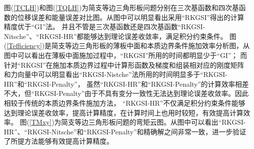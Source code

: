 图(\ref{TCLH})和图(\ref{TQLH})为简支等边三角形板问题分别在三次基函数和四次基函数的位移误差和能量误差对比图。从图中可以明显看出采用“RKGSI”得出的计算精度优于“GI”法。
并且不管是三次基函数还是四次基函数“RKGSI-Nitsche”、“RKGSI-HR”都能够达到理论误差收敛率，满足积分约束条件。
图(\ref{Tefficiency})是简支等边三角形板的薄板中面和本质边界条件施加效率分析图，从图中可以看出在薄板中面施加过程中，“RKGSI”所用的时间都明显少于“GI”；
而针对“RKGSI”在施加本质边界过程中计算形函数及梯度和组装相对应的刚度矩阵和力向量中可以明显看出“RKGSI-Nistche”法所用的时间明显多于“RKGSI-HR”和“RKGSI-Penalty”，
虽然“RKGSI-HR”和“RKGSI-Penalty”的计算效率相差不大，但“RKGSI-Penalty”由于不具有变分一致性无法达到理论误差收敛率。因此相较于传统的本质边界条件施加方法，
“RKGSI-HR”不仅满足积分约束条件能够达到理论误差收敛率，提高计算精度，在计算时间上也用时较短，有效提高计算效率。
图(\ref{TMxy})为简支等边三角形板问题的弯矩云图。从图中可以看出“RKGSI-HR”、“RKGSI-Nitsche”和“RKGSI-Penalty”和精确解之间非常一致，进一步验证了所提方法能够有效提高计算精度。
\newpage
